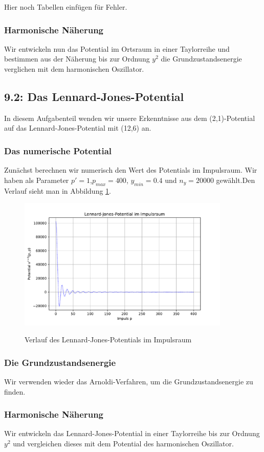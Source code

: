 \documentclass[11pt,a4paper]{article}
\begin{document}
Hier noch Tabellen einfügen für Fehler.
\subsubsection*{Harmonische Näherung}
Wir entwickeln nun das Potential im Ortsraum in einer Taylorreihe und bestimmen aus der Näherung bis zur Ordnung $y^2$ die Grundzustandsenergie verglichen mit dem harmonischen Oszillator.
\subsection*{9.2: Das Lennard-Jones-Potential}
In diesem Aufgabenteil wenden wir unsere Erkenntnisse aus dem (2,1)-Potential auf das Lennard-Jones-Potential mit (12,6) an.
\subsubsection*{Das numerische Potential}
 Zunächst berechnen wir numerisch den Wert des Potentials im Impulsraum. Wir haben als Parameter $p'=1$,$p_{max}=400$, $y_{min}=0.4$ und $n_y = 20000$ gewählt.Den Verlauf sieht man in Abbildung \ref{fig:lennard_jones_pot}.
\begin{figure}[htbp]
	\includegraphics[width=0.9\textwidth]{lennard_jones_pot.pdf}\label{fig:lennard_jones_pot}
	\caption{Verlauf des Lennard-Jones-Potentials im Impulsraum}
\end{figure}
\subsubsection*{Die Grundzustandsenergie}
Wir verwenden wieder das Arnoldi-Verfahren, um die Grundzustandsenergie zu finden.
\subsubsection*{Harmonische Näherung}
Wir entwickeln das Lennard-Jones-Potential in einer Taylorreihe bis zur Ordnung $y^2$ und vergleichen dieses mit dem Potential des harmonischen Oszillator.
\newpage
\listoffigures
\end{document}
